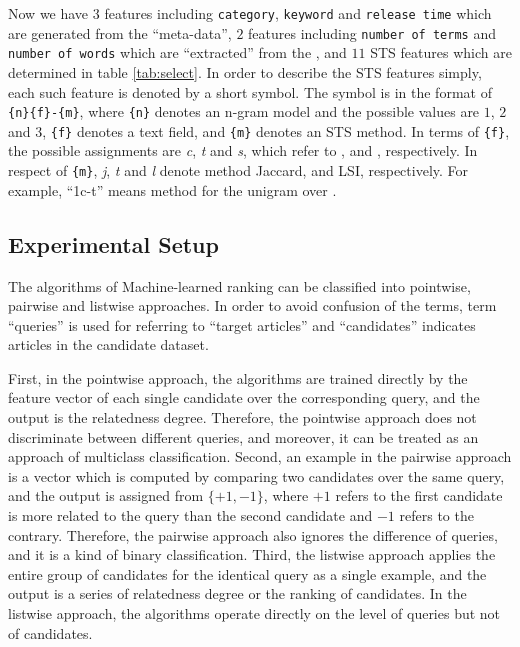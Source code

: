 Now we have $3$ features including \texttt{category}, \texttt{keyword} and \texttt{release time} which are generated from the ``meta-data'', $2$ features including \texttt{number of terms} and \texttt{number of words} which are ``extracted'' from the \icontent{}, and $11$ STS features which are determined in table \ref{tab:select}. In order to describe the STS features simply, each such feature is denoted by a short symbol. The symbol is in the format of \texttt{\{n\}\{f\}-\{m\}}, where \texttt{\{n\}} denotes an n-gram model and the possible values are $1$, $2$ and $3$, \texttt{\{f\}} denotes a text field, and \texttt{\{m\}} denotes an STS method. In terms of \texttt{\{f\}}, the possible assignments are \textit{c}, \textit{t} and \textit{s}, which refer to \icontent{}, \ititle{} and \isummary{}, respectively. In respect of \texttt{\{m\}}, \textit{j}, \textit{t} and \textit{l} denote method Jaccard, \tfidf{} and LSI, respectively. For example, ``1c-t'' means method \tfidf{} for the unigram over \icontent{}.


\subsection{Experimental Setup}
\label{sec:6.3}

The algorithms of Machine-learned ranking can be classified into pointwise, pairwise and listwise approaches. In order to avoid confusion of the terms, term ``queries'' is used for referring to ``target articles'' and ``candidates'' indicates articles in the candidate dataset. 

First, in the pointwise approach, the algorithms are trained directly by the feature vector of each single candidate over the corresponding query, and the output is the relatedness degree. Therefore, the pointwise approach does not discriminate between different queries, and moreover, it can be treated as an approach of multiclass classification. Second, an example in the pairwise approach is a vector which is computed by comparing two candidates over the same query, and the output is assigned from $\{+1, -1\}$, where $+1$ refers to the first candidate is more related to the query than the second candidate and $-1$ refers to the contrary. Therefore, the pairwise approach also ignores the difference of queries, and it is a kind of binary classification. Third, the listwise approach applies the entire group of candidates for the identical query as a single example, and the output is a series of relatedness degree or the ranking of candidates. In the listwise approach, the algorithms operate directly on the level of queries but not of candidates. 

